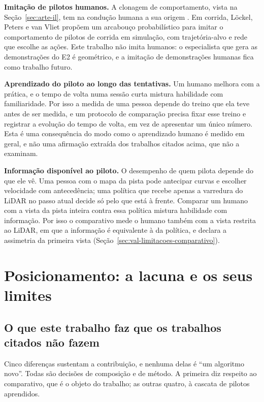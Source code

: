 \textbf{Imitação de pilotos humanos.} A clonagem de comportamento, vista na
Seção~\ref{sec:arte-il}, tem na condução humana a sua origem
\cite{Pomerleau1989ALVINN, Bojarski2016EndToEnd}. Em corrida, Löckel, Peters e
van Vliet \cite{Lockel2020ProMoD} propõem um arcabouço probabilístico para imitar
o comportamento de pilotos de corrida em simulação, com trajetória-alvo e rede
que escolhe as ações. Este trabalho não imita humanos: o especialista que
gera as demonstrações do E2 é geométrico, e a imitação de demonstrações humanas
fica como trabalho futuro.

\textbf{Aprendizado do piloto ao longo das tentativas.} Um humano melhora com a
prática, e o tempo de volta numa sessão curta mistura habilidade com
familiaridade. Por isso a medida de uma pessoa depende do treino que ela teve
antes de ser medida, e um protocolo de comparação precisa fixar esse treino e
registrar a evolução do tempo de volta, em vez de apresentar um único número.
Esta é uma consequência do modo como o aprendizado humano é medido em geral, e
não uma afirmação extraída dos trabalhos citados acima, que não a examinam.

\textbf{Informação disponível ao piloto.} O desempenho de quem pilota depende do
que ele vê. Uma pessoa com o mapa da pista pode antecipar curvas e escolher
velocidade com antecedência; uma política que recebe apenas a varredura do LiDAR
no passo atual decide só pelo que está à frente. Comparar um humano com a vista
da pista inteira contra essa política mistura habilidade com informação. Por isso
o comparativo mede o humano também com a vista restrita ao LiDAR, em que a
informação é equivalente à da política, e declara a assimetria da primeira vista
(Seção~\ref{sec:val-limitacoes-comparativo}).

\section{Posicionamento: a lacuna e os seus limites}\label{sec:arte-lacuna}

\subsection{O que este trabalho faz que os trabalhos citados não fazem}

Cinco diferenças sustentam a contribuição, e nenhuma delas é ``um algoritmo
novo''. Todas são decisões de composição e de método. A primeira diz respeito ao
comparativo, que é o objeto do trabalho; as outras quatro, à cascata de pilotos
aprendidos.

